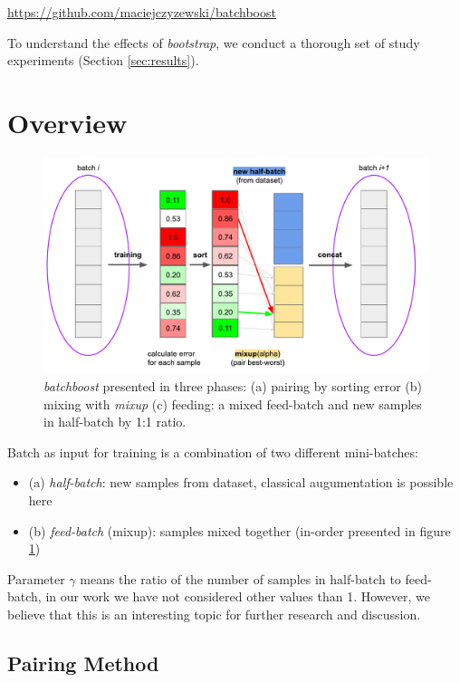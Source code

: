 \documentclass{article}
\begin{document}
\begin{center}
\url{https://github.com/maciejczyzewski/batchboost}
\end{center}

To understand the effects of \emph{bootstrap}, we conduct a
thorough set of study experiments (Section \ref{sec:results}).

\section{Overview}
\label{sec:overview}

\begin{figure}[H]
  \centering
  \includegraphics[width=\linewidth]{figure-abstract}
  \caption{\emph{batchboost} presented in three phases: (a) pairing by sorting
	  error (b) mixing with \emph{mixup} (c) feeding: a mixed feed-batch and new
	  samples in half-batch by 1:1 ratio.}
  \label{fig:abstract}
\end{figure}

Batch as input for training is a combination of two different mini-batches:
\begin{itemize}
\item (a) \emph{half-batch}: new samples from dataset, classical augumentation is possible here
\item (b) \emph{feed-batch} (mixup): samples mixed together (in-order presented in
figure \ref{fig:abstract})
\end{itemize}

Parameter $\gamma$ means the ratio of the number of samples in half-batch to
feed-batch, in our work we have not considered other values than 1. However, we believe that this is an interesting topic for further research and discussion.

\subsection{Pairing Method}
\label{sec:pairing}
\end{document}
